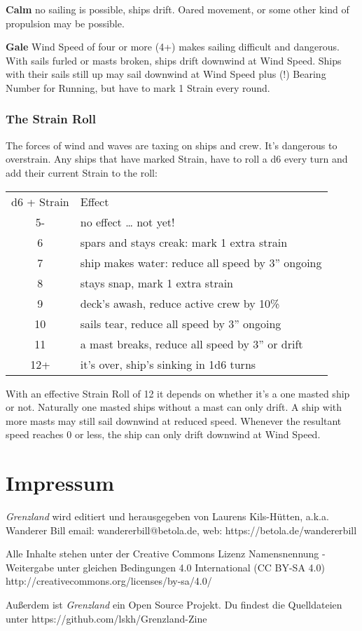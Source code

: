 \documentclass[11pt]{wbzine}
\begin{document}
\begin{multicols}{2}
\textbf{Calm} no sailing is possible, ships drift. Oared movement, or
some other kind of propulsion may be possible.

\textbf{Gale} Wind Speed of four or more (4+) makes sailing difficult
and dangerous. With sails furled or masts broken, ships drift downwind
at Wind Speed. Ships with their sails still up may sail downwind at Wind
Speed plus (!) Bearing Number for Running, but have to mark 1 Strain
every round.

\subsubsection{The Strain Roll}

The forces of wind and waves are taxing on ships and crew. It's
dangerous to overstrain. Any ships that have marked Strain, have to roll
a d6 every turn and add their current Strain to the roll:

\begin{tabularx}{\columnwidth}{cZ}
d6 + Strain & Effect \\
5- & no effect \ldots{} not yet! \\
6 & spars and stays creak: mark 1 extra strain \\
7 & ship makes water: reduce all speed by 3'' ongoing \\
8 & stays snap, mark 1 extra strain \\
9 & deck's awash, reduce active crew by 10\% \\
10 & sails tear, reduce all speed by 3'' ongoing \\
11 & a mast breaks, reduce all speed by 3'' or drift \\
12+ & it's over, ship's sinking in 1d6 turns \\
\end{tabularx}

With an effective Strain Roll of 12 it depends on whether it's a one
masted ship or not. Naturally one masted ships without a mast can only
drift. A ship with more masts may still sail downwind at reduced speed.
Whenever the resultant speed reaches 0 or less, the ship can only drift
downwind at Wind Speed.

\end{multicols}



\section{Impressum}

\textit{Grenzland} wird editiert und 
herausgegeben von Laurens Kils-Hütten,
a.k.a. Wanderer Bill 
email: wandererbill@betola.de, web: https://betola.de/wandererbill

Alle Inhalte stehen unter der Creative Commons Lizenz 
Namensnennung - Weitergabe unter gleichen Bedingungen 4.0 International 
(CC BY-SA 4.0)
http://creativecommons.org/licenses/by-sa/4.0/

Außerdem ist \textit{Grenzland} ein Open Source Projekt. Du
findest die Quelldateien unter https://github.com/lskh/Grenzland-Zine

\end{document}
